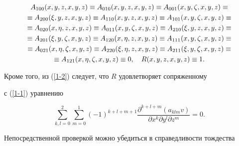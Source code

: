 \begin{gather}


A_{100}(x,y,z,x,y,z)\equiv A_{010}(x,y,z,x,y,z)\equiv


A_{001}(x,y,\zeta,x,y,z)\equiv\notag \\


\equiv A_{200}(\xi,y,z,x,y,z)\equiv A_{110}(x,y,z,x,y,z)\equiv


A_{101}(x,y,\zeta,x,y,z)\equiv\notag \\


\equiv A_{020}(x,\eta,z,x,y,z)\equiv A_{011}(x,y,\zeta,x,y,z)\equiv


A_{210}(\xi,y,z,x,y,z)\equiv\notag \\


\equiv A_{201}(\xi,y,\zeta,x,y,z)\equiv A_{120}(x,\eta,z,x,y,z)\equiv


A_{111}(x,y,\zeta,x,y,z)\equiv\notag \\


\equiv A_{021}(x,\eta,\zeta,x,y,z)\equiv A_{220}(\xi,\eta,z,x,y,z)\equiv


A_{211}(\xi,y,\zeta,x,y,z)\equiv\notag \\


\label{1-3}


\equiv A_{121}(x,\eta,\zeta,x,y,z)\equiv 0,\quad


R(x,y,z,x,y,z)\equiv 1.


\end{gather}


Кроме того, из (\ref{1-2}) следует, что $R$ удовлетворяет сопряженному


с (\ref{1-1}) уравнению


\begin{equation*}


\sum_{k,l=0}^{2}\sum_{m=0}^{1} (-1)^{k+l+m+1}


\frac{\partial^{k+l+m}(a_{klm}v)}{


\partial x^{k} \partial y^{l} \partial z^{m}}=0.


\end{equation*}





Непосредственной проверкой можно убедиться в справедливости тождества


